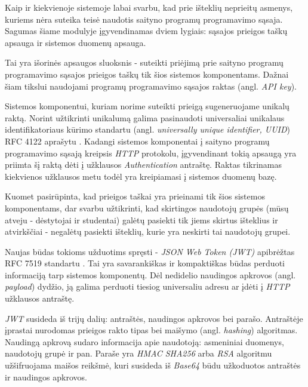 \documentclass{VUMIFPSkursinis}
\begin{document}
Kaip ir kiekvienoje sistemoje labai svarbu, kad prie išteklių neprieitų asmenys, kuriems nėra suteika teisė naudotis saityno programų programavimo sąsaja. Sagumas šiame modulyje įgyvendinamas dviem lygiais: sąsajos prieigos taškų apsauga ir sistemos duomenų apsauga.


Tai yra išorinės apsaugos sluoksnis - suteikti priėjimą prie saityno programų programavimo sąsajos prieigos taškų tik šios sistemos komponentams. Dažnai šiam tikslui naudojami programų programavimo sąsajos raktas (angl. \textit{API key}).

Sistemos komponentui, kuriam norime suteikti prieigą sugeneruojame unikalų raktą. Norint užtikrinti unikalumą galima pasinaudoti universaliai unikalaus identifikatoriaus kūrimo standartu (angl. \textit{universally unique identifier, UUID}) RFC 4122 aprašytu \cite{uuidRef}. Kadangi sistemos komponentai į saityno programų programavimo sąsają kreipsis \textit{HTTP} protokolu, įgyvendinant tokią apsaugą yra priimta šį raktą dėti į užklausos \textit{Authentication} antraštę. Raktas tikrinamas kiekvienos užklausos metu todėl yra kreipiamasi į sistemos duomenų bazę.


Kuomet pasirūpinta, kad prieigos taškai yra prieinami tik šios sistemos komponentams, dar svarbu užtikrinti, kad skirtingos naudotojų grupės (mūsų atveju - dėstytojai ir studentai) galėtų pasiekti tik jiems skirtus išteklius ir atvirkščiai - negalėtų pasiekti išteklių, kurie yra neskirti tai naudotojų grupei.

Naujas būdas tokioms užduotims spręsti - \textit{JSON Web Token (JWT)}  apibrėžtas RFC 7519 standartu \cite{jwtRef}. Tai yra savarankiškas ir kompaktiškas būdas perduoti informaciją tarp sistemos komponentų. Dėl nedidelio naudingos apkrovos (angl. \textit{payload}) dydžio, ją galima perduoti tiesiog universaliu adresu ar įdėti į \textit{HTTP} užklausos antraštę.

\textit{JWT} susideda iš trijų dalių: antraštės, naudingos apkrovos bei parašo. Antraštėje įprastai nurodomas prieigos rakto tipas bei maišymo (angl. \textit{hashing}) algoritmas. Naudingą apkrovą sudaro informacija apie naudotoją: asmeniniai duomenys, naudotojų grupė ir pan. Paraše yra \textit{HMAC SHA256} arba \textit{RSA} algoritmu užšifruojama maišos reikšmė, kuri susideda iš \textit{Base64} būdu užkoduotos antraštės ir naudingos apkrovos.
\end{document}
